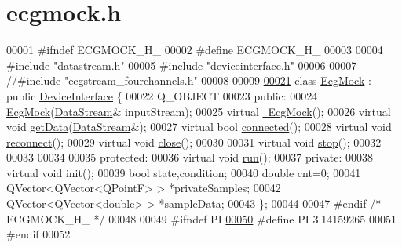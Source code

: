 \hypertarget{ecgmock_8h_source}{}\section{ecgmock.\+h}
\label{ecgmock_8h_source}

\begin{DoxyCode}
00001 \textcolor{preprocessor}{#ifndef ECGMOCK\_H\_}
00002 \textcolor{preprocessor}{#define ECGMOCK\_H\_}
00003 
00004 \textcolor{preprocessor}{#include "\hyperlink{datastream_8h}{datastream.h}"}
00005 \textcolor{preprocessor}{#include "\hyperlink{deviceinterface_8h}{deviceinterface.h}"}
00006 
00007 \textcolor{comment}{//#include "ecgstream\_fourchannels.h"}
00008 
00009 
\hypertarget{ecgmock_8h_source.tex_l00021}{}\hyperlink{classEcgMock}{00021} \textcolor{keyword}{class }\hyperlink{classEcgMock}{EcgMock}   : \textcolor{keyword}{public} \hyperlink{classDeviceInterface}{DeviceInterface} \{
00022     Q\_OBJECT
00023 \textcolor{keyword}{public}:
00024     \hyperlink{classEcgMock_a880936385845728f4d96a54848d8ab6e}{EcgMock}(\hyperlink{classDataStream}{DataStream}& inputStream);
00025     \textcolor{keyword}{virtual} \hyperlink{classEcgMock_a977966ab6184171d95c9f9c01eca0c7a}{~EcgMock}();
00026     \textcolor{keyword}{virtual} \textcolor{keywordtype}{void} \hyperlink{classEcgMock_aaa2628c0e8364980e6f252dfc3b86d1a}{getData}(\hyperlink{classDataStream}{DataStream}&); 
00027     \textcolor{keyword}{virtual} \textcolor{keywordtype}{bool} \hyperlink{classEcgMock_ab5e3aac9d92b52b23fafb6e540902f28}{connected}(); 
00028     \textcolor{keyword}{virtual} \textcolor{keywordtype}{void} \hyperlink{classEcgMock_aed480e6edc6016917a5663f61b3a5091}{reconnect}(); 
00029     \textcolor{keyword}{virtual} \textcolor{keywordtype}{void} \hyperlink{classEcgMock_a34af13005b5ea44386b7b875b72e9fc3}{close}(); 
00030 
00031     \textcolor{keyword}{virtual} \textcolor{keywordtype}{void} \hyperlink{classEcgMock_aa65eb7c062913402c77ed1dc628168a7}{stop}();
00032 
00033 
00034 
00035 \textcolor{keyword}{protected}:
00036     \textcolor{keyword}{virtual} \textcolor{keywordtype}{void} \hyperlink{classEcgMock_a8822f99759fcfe9648262007cb380daa}{run}();
00037 \textcolor{keyword}{private}:
00038     \textcolor{keyword}{virtual} \textcolor{keywordtype}{void} init();
00039     \textcolor{keywordtype}{bool} state,condition;
00040     \textcolor{keywordtype}{double} cnt=0;
00041     QVector<QVector<QPointF> > *privateSamples;
00042     QVector<QVector<double> > *sampleData;
00043 \};
00044 
00047 \textcolor{preprocessor}{#endif }\textcolor{comment}{/* ECGMOCK\_H\_ */}\textcolor{preprocessor}{}
00048 
00049 \textcolor{preprocessor}{#ifndef PI}
\hypertarget{ecgmock_8h_source.tex_l00050}{}\hyperlink{ecgmock_8h_a598a3330b3c21701223ee0ca14316eca}{00050} \textcolor{preprocessor}{#define PI 3.14159265}
00051 \textcolor{preprocessor}{#endif}
00052 
\end{DoxyCode}

